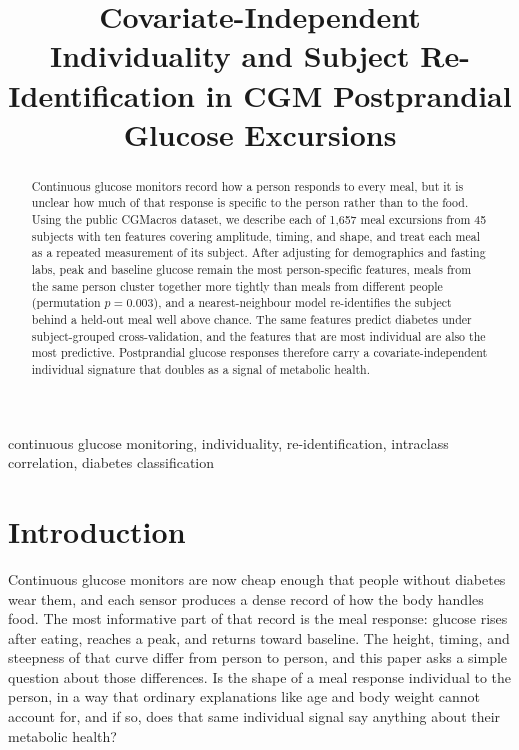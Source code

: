 \documentclass[10pt,conference,compsoc]{IEEEtran}
\begin{document}
\title{Covariate-Independent Individuality and Subject Re-Identification in CGM
Postprandial Glucose Excursions}

\author{
}

\maketitle

\begin{abstract}
Continuous glucose monitors record how a person responds to every meal, but it is
unclear how much of that response is specific to the person rather than to the
food. Using the public CGMacros dataset, we describe each of 1{,}657 meal
excursions from 45 subjects with ten features covering amplitude, timing, and
shape, and treat each meal as a repeated measurement of its subject. After
adjusting for demographics and fasting labs, peak and baseline glucose remain the
most person-specific features, meals from the same person cluster together more
tightly than meals from different people (permutation $p = 0.003$), and a
nearest-neighbour model re-identifies the subject behind a held-out meal well
above chance. The same features predict diabetes under subject-grouped
cross-validation, and the features that are most individual are also the most
predictive. Postprandial glucose responses therefore carry a covariate-independent
individual signature that doubles as a signal of metabolic health.
\end{abstract}

\begin{IEEEkeywords}
continuous glucose monitoring, individuality, re-identification, intraclass
correlation, diabetes classification
\end{IEEEkeywords}

\section{Introduction}

Continuous glucose monitors are now cheap enough that people without diabetes
wear them, and each sensor produces a dense record of how the body handles food.
The most informative part of that record is the meal response: glucose rises
after eating, reaches a peak, and returns toward baseline. The height, timing,
and steepness of that curve differ from person to person, and this paper asks a
simple question about those differences. Is the shape of a meal response
individual to the person, in a way that ordinary explanations like age and body
weight cannot account for, and if so, does that same individual signal say
anything about their metabolic health?
\end{document}
